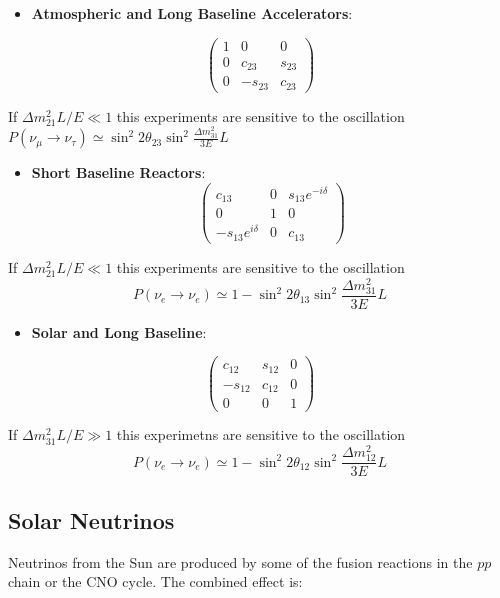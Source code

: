 \documentclass[
  letterpaper,
  DIV=11,
  numbers=noendperiod]{scrreprt}
\providecommand{\tightlist}{%
  \setlength{\itemsep}{0pt}\setlength{\parskip}{0pt}}\usepackage{longtable,booktabs,array}
\begin{document}
\begin{itemize}
\tightlist
\item
  \textbf{Atmospheric and Long Baseline Accelerators}:
\end{itemize}

\[\begin{pmatrix} 1 & 0 & 0 \\ 0 & c_{23} & s_{23} \\ 0 & -s_{23} & c_{23} \end{pmatrix}\]

If \(\Delta m_{21}^2L/E \ll 1\) this experiments are sensitive to the
oscillation
\(P(\nu_\mu \rightarrow \nu_\tau) \simeq \sin^2 2\theta_{23}\sin^2\frac{\Delta m_{31}^2}{3E}L\)

\begin{itemize}
\tightlist
\item
  \textbf{Short Baseline Reactors}:
  \[\begin{pmatrix} c_{13} & 0 & s_{13}e^{-i\delta}\\ 0 & 1 & 0\\ -s_{13}e^{i\delta} & 0 & c_{13}\end{pmatrix}\]
\end{itemize}

If \(\Delta m_{21}^2L/E \ll 1\) this experiments are sensitive to the
oscillation
\[ P(\nu_e \rightarrow \nu_e) \simeq 1 - \sin^2 2\theta_{13}\sin^2\frac{\Delta m_{31}^2}{3E}L\]

\begin{itemize}
\tightlist
\item
  \textbf{Solar and Long Baseline}:
\end{itemize}

\[\begin{pmatrix} c_{12} & s_{12} & 0 \\ -s_{12} & c_{12} & 0 \\ 0 & 0 & 1 \end{pmatrix}\]

If \(\Delta m_{31}^2L/E \gg 1\) this experimetns are sensitive to the
oscillation
\[ P(\nu_e \rightarrow \nu_e) \simeq 1 - \sin^2 2\theta_{12}\sin^2\frac{\Delta m_{12}^2}{3E}L\]

\subsection{Solar Neutrinos}\label{solar-neutrinos}

Neutrinos from the Sun are produced by some of the fusion reactions in
the \(pp\) chain or the CNO cycle. The combined effect is:
\end{document}
